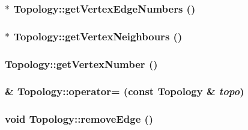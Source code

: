 \label{classTopology_a76539d6c987a01998e17868bb6b1f50f}
\hypertarget{classTopology_aa764ec0eb01782b1da56e7882fbdfa4b}{
\subsubsection[{getVertexEdgeNumbers}]{ $\ast$ Topology::getVertexEdgeNumbers ()}}
\label{classTopology_aa764ec0eb01782b1da56e7882fbdfa4b}
\hypertarget{classTopology_abda57225c9ada001a4a3a7bb12a344c7}{
\subsubsection[{getVertexNeighbours}]{ $\ast$ Topology::getVertexNeighbours ()}}
\label{classTopology_abda57225c9ada001a4a3a7bb12a344c7}
\hypertarget{classTopology_a1739e171c7b41c15482ed3237a02f726}{
\subsubsection[{getVertexNumber}]{ Topology::getVertexNumber ()}}
\label{classTopology_a1739e171c7b41c15482ed3237a02f726}
\hypertarget{classTopology_aa1e29c8e1c83691efb7eced75d8e085b}{
\subsubsection[{operator=}]{ \& Topology::operator= (const {\bf Topology} \& {\em topo})}}
\label{classTopology_aa1e29c8e1c83691efb7eced75d8e085b}
\hypertarget{classTopology_a35b065f16c37e1c1be58c51eef36cacd}{
\subsubsection[{removeEdge}]{\setlength{\rightskip}{0pt plus 5cm}void Topology::removeEdge ()}}
